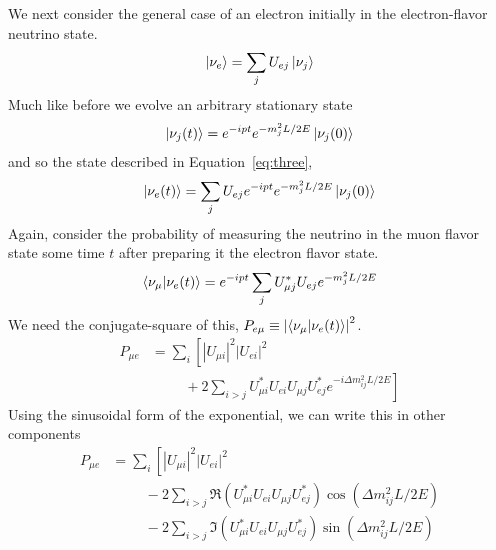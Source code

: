 \documentclass[main.tex]{subfiles}
\begin{document}
We next consider the general case of an electron initially in the electron-flavor neutrino state. 
\begin{equation}\label{eq:three}
    \left| \nu_{e} \right > =\sum\limits_{j} U_{ej} \left| \nu_{j} \right > 
\end{equation}
Much like before we evolve an arbitrary stationary state
\begin{equation}
    \left| \nu_{j} (t) \right >  = e^{-ipt}e^{ -m_{j}^{2}L/2E}\left| \nu_{j} (0) \right >
\end{equation}
and so the state described in Equation~\eqref{eq:three},
\begin{equation}
    \left| \nu_{e}(t) \right > = \sum\limits_{j} U_{ej} e^{-ipt}e^{ -m_{j}^{2}L/2E}\left| \nu_{j} (0) \right >
\end{equation}
Again, consider the probability of measuring the neutrino in the muon flavor state some time $t$ after preparing it the electron flavor state. 
\begin{equation}
    \left< \nu_{\mu} | \nu_{e}(t) \right> = e^{-ipt} \sum\limits_{j} U_{\mu j}^{*}U_{ej} e^{ -m_{j}^{2}L/2E}
\end{equation}
We need the conjugate-square of this, $P_{e\mu} \equiv \left|\left< \nu_{\mu}|\nu_{e}(t) \right>\right|^{2}$.
\begin{equation}\begin{split}
P_{\mu e}&= \sum\limits_{i}\left[\left|U_{\mu i}\right|^{2}\left|U_{e i}\right|^{2} \right.\\
&\hspace{1cm} + 2\sum\limits_{i>j}U_{\mu i}^{*}U_{e i}U_{\mu j}U_{e j}^{*}\left.e^{-i\Delta m_{ij}^{2}L/2E} \right]
\end{split}\end{equation} 
Using the sinusoidal form of the exponential, we can write this in other components 
\begin{equation}\begin{split}
    P_{\mu e}&= \sum\limits_{i}\left[\left|U_{\mu i}\right|^{2}\left|U_{e i}\right|^{2} \right.\\
    &\hspace{1cm} -2\sum\limits_{i>j} \Re(U_{\mu i}^{*}U_{e i}U_{\mu j}U_{e j}^{*})\cos\left(\Delta m_{ij}^{2}L/2E \right) \\
    &\hspace{1cm} -2\sum\limits_{i>j}\Im(U_{\mu i}^{*}U_{e i}U_{\mu j}U_{e j}^{*})\sin\left(\Delta m_{ij}^{2}L/2E \right)
\end{split}\end{equation} 
\end{document}
